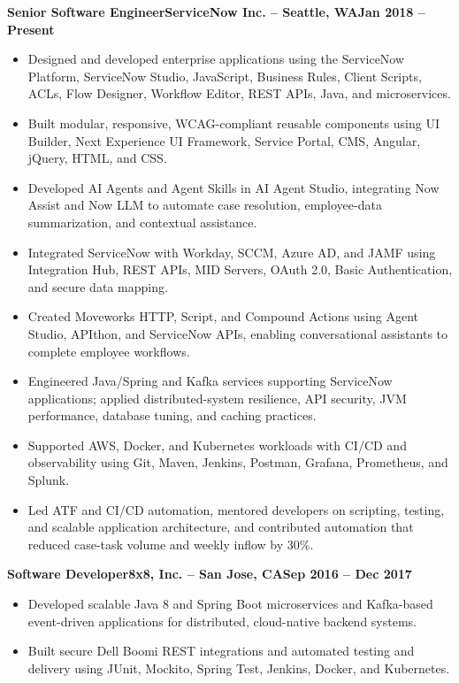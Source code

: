 ﻿\documentclass[10pt,letterpaper]{article}
\newenvironment{highlights}{
    \begin{itemize}[
        topsep=0pt,
        parsep=0.10cm,
        partopsep=0pt,
        itemsep=0pt,
        leftmargin=10pt
    ]
}{
    \end{itemize}
}
\newenvironment{onecolentry}{}{}
\newcommand{\experienceheading}[3]{
    \noindent\textbf{#1}\hfill\textbf{#2}\hfill\textbf{#3}\par
    \vspace{-0.14cm}
}
\begin{document}
\experienceheading
    {Senior Software Engineer}
    {ServiceNow Inc. -- Seattle, WA}
    {Jan 2018 -- Present}
\begin{onecolentry}
\begin{highlights}
    \item Designed and developed enterprise applications using the ServiceNow Platform, ServiceNow Studio, JavaScript, Business Rules, Client Scripts, ACLs, Flow Designer, Workflow Editor, REST APIs, Java, and microservices.
    \item Built modular, responsive, WCAG-compliant reusable components using UI Builder, Next Experience UI Framework, Service Portal, CMS, Angular, jQuery, HTML, and CSS.
    \item Developed AI Agents and Agent Skills in AI Agent Studio, integrating Now Assist and Now LLM to automate case resolution, employee-data summarization, and contextual assistance.
    \item Integrated ServiceNow with Workday, SCCM, Azure AD, and JAMF using Integration Hub, REST APIs, MID Servers, OAuth 2.0, Basic Authentication, and secure data mapping.
    \item Created Moveworks HTTP, Script, and Compound Actions using Agent Studio, APIthon, and ServiceNow APIs, enabling conversational assistants to complete employee workflows.
    \item Engineered Java/Spring and Kafka services supporting ServiceNow applications; applied distributed-system resilience, API security, JVM performance, database tuning, and caching practices.
    \item Supported AWS, Docker, and Kubernetes workloads with CI/CD and observability using Git, Maven, Jenkins, Postman, Grafana, Prometheus, and Splunk.
    \item Led ATF and CI/CD automation, mentored developers on scripting, testing, and scalable application architecture, and contributed automation that reduced case-task volume and weekly inflow by 30\%.
\end{highlights}
\end{onecolentry}

\vspace{0.04cm}

\experienceheading
    {Software Developer}
    {8x8, Inc. -- San Jose, CA}
    {Sep 2016 -- Dec 2017}
\begin{onecolentry}
\begin{highlights}
    \item Developed scalable Java 8 and Spring Boot microservices and Kafka-based event-driven applications for distributed, cloud-native backend systems.
    \item Built secure Dell Boomi REST integrations and automated testing and delivery using JUnit, Mockito, Spring Test, Jenkins, Docker, and Kubernetes.
\end{highlights}
\end{onecolentry}
\end{document}
